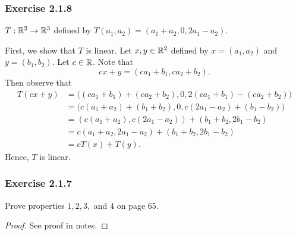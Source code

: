 \subsubsection{Exercise 2.1.8} \( T: \mathbb{R}^{2} \to \mathbb{R}^{3}  \) defined by \( T(a_{1},a_{2}) = (a_{1} + a_{2}, 0, 2a_{1} - a_{2}) \).
\begin{solution}
   First, we show that \( T  \) is linear. Let \( x,y \in \mathbb{R}^{2}  \) defined by \( x = ({a}_{1}, {a}_{2}) \) and \( y = ({b}_{1}, {b}_{2}) \). Let \( c \in \mathbb{R}  \). Note that 
   \[  cx + y = ({ca}_{1} + {b}_{1}, {ca}_{2} + {b}_{2}). \]
   Then observe that
   \begin{align*}
       T(cx + y)  &= \Big( ({ca}_{1} + {b}_{1}) + ({ca}_{2} + {b}_{2}), 0, 2({ca}_{1} + {b}_{1}) - ({ca}_{2} + {b}_{2}) \Big)  \\
                  &=  \Big( c({a}_{1} + {a}_{2}) + ({b}_{1} + {b}_{2}), 0, c ({2a}_{1} - {a}_{2}) + ({b}_{1} - {b}_{2}) \Big) \\
                  &=  (c({a}_{1} + {a}_{2}), c({2a}_{1} - {a}_{2})) + ({b}_{1} + {b}_{2}, {2b}_{1} - {b}_{2}) \\
                  &= c({a}_{1} + {a}_{2}, {2a}_{1} - {a}_{2}) + ({b}_{1} + {b}_{2}, {2b}_{1} - {b}_{2}) \\
                  &= cT(x) + T(y).
   \end{align*}
   Hence, \( T  \) is linear.
\end{solution}



\subsubsection{Exercise 2.1.7} Prove properties \( 1,2,3, \) and \( 4 \) on page 65.
\begin{proof}
See proof in notes.
\end{proof}

